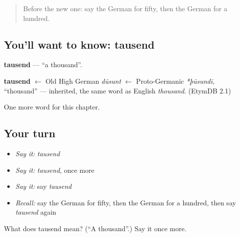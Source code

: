\begin{quote}
Before the new one: say the German for fifty, then the German for a hundred.
\end{quote}

\subsection*{You'll want to know: tausend}
\textbf{tausend} — \textquotedblleft{}a thousand\textquotedblright{}.

\begin{cousinweb}
\textbf{tausend} $\leftarrow$ Old High German \emph{dūsunt} $\leftarrow$ Proto-Germanic \emph{*þūsundī}, \textquotedblleft{}thousand\textquotedblright{} — inherited, the same word as English \emph{thousand}. (EtymDB 2.1)
\end{cousinweb}

\begin{grammarlens}[title={What you've built}]
One more word for this chapter.
\end{grammarlens}

\subsection*{Your turn}
\begin{itemize}
\raggedright
  \item \emph{Say it:} \emph{tausend}
  \item \emph{Say it:} \emph{tausend}, once more
  \item \emph{Say it:} say \emph{tausend}
  \item \emph{Recall:} say the German for fifty, then the German for a hundred, then say \emph{tausend} again
\end{itemize}

\begin{tcolorbox}[breakable,colback=teal!4,colframe=teal!35!black,title={Before you move on}]
What does tausend mean? (\textquotedblleft{}A thousand\textquotedblright{}.) Say it once more.
\end{tcolorbox}
